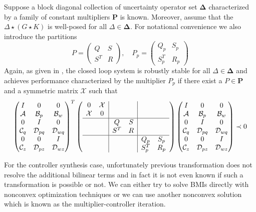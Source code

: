 Suppose a block diagonal collection of uncertainty operator set $\bm{\Delta}$ characterized by a family of constant multipliers $\mathbf{P}$
is known. Moreover, assume that the $\Delta\star(G\star K)$ is well-posed for all $\Delta\in\bm{\Delta}$. For notational convenience we also 
introduce the partitions 
\[
P=\begin{pmatrix}Q&S\\ S^T&R\end{pmatrix},\quad P_p=\begin{pmatrix}Q_p&S_p\\ S^T_p&R_p\end{pmatrix}
\]
Again, as given in , the closed loop system is robustly stable for all $\Delta\in\bm{\Delta}$ and achieves performance 
characterized by the multiplier $P_p$ if there exist a $P\in\mathbf{P}$ and a symmetric matrix $\mathcal{X}$ such that 
\begin{equation}
\begin{pmatrix}
I&0&0\\\mathcal{A}&\mathcal{B}_p&\mathcal{B}_w\\
0&I&0\\\mathcal{C}_q&\mathcal{D}_{pq}&\mathcal{D}_{wq}\\
0&0&I\\\mathcal{C}_z&\mathcal{D}_{pz}&\mathcal{D}_{wz}
\end{pmatrix}^T
\left(
\begin{array}{cc|cc|cc}
	0&\mathcal{X}&&&&\\
	\mathcal{X}&0&&&&\\\hline
	&&Q&S&&\\
	&&S^T&R&&\\\hline
	&&&&Q_p&S_p\\
	&&&&S_p^T&R_p\\
\end{array}
\right)
\begin{pmatrix}
I&0&0\\\mathcal{A}&\mathcal{B}_p&\mathcal{B}_w\\
0&I&0\\\mathcal{C}_q&\mathcal{D}_{pq}&\mathcal{D}_{wq}\\
0&0&I\\\mathcal{C}_z&\mathcal{D}_{pz}&\mathcal{D}_{wz}
\end{pmatrix}\prec 0
\label{eq:analysisLMI}
\end{equation}

%
%

For the controller synthesis case, unfortunately previous transformation does not resolve the additional bilinear terms and in fact it is 
not even known if such a transformation is possible or not. We can either try to solve BMIs directly with nonconvex optimization techniques 
or we can use another nonconvex solution which is known as the multiplier-controller iteration. 

